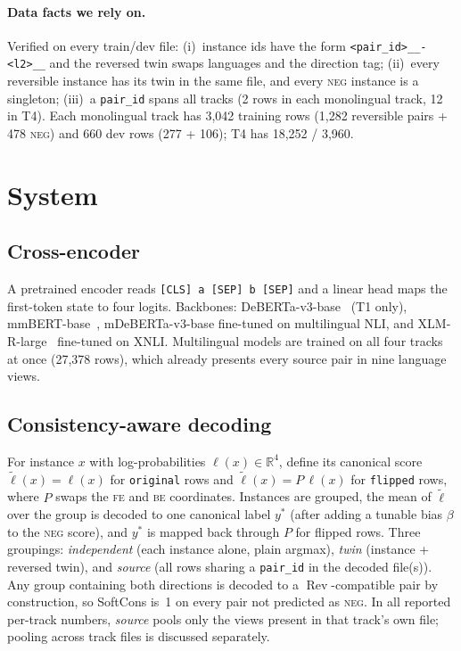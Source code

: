 \documentclass[11pt,a4paper]{article}
\newcommand{\rev}{\operatorname{Rev}}
\newcommand{\FE}{\textsc{fe}}
\newcommand{\BE}{\textsc{be}}
\newcommand{\NEG}{\textsc{neg}}
\begin{document}
\paragraph{Data facts we rely on.} Verified on every train/dev file:
(i)~instance ids have the form \texttt{<pair\_id>\_\_-<l2>\_\_}
and the reversed twin swaps languages and the direction tag;
(ii)~every reversible instance has its twin in the same file, and every \NEG{}
instance is a singleton;
(iii)~a \texttt{pair\_id} spans all tracks (2 rows in each monolingual track, 12
in T4).
Each monolingual track has 3{,}042 training rows (1{,}282 reversible pairs + 478
\NEG) and 660 dev rows (277 + 106); T4 has 18{,}252 / 3{,}960.

\section{System}

\subsection{Cross-encoder}
A pretrained encoder reads \texttt{[CLS] a [SEP] b [SEP]} and a linear head maps
the first-token state to four logits. Backbones: DeBERTa-v3-base~\cite{debertav3}
(T1 only), mmBERT-base~\cite{mmbert}, mDeBERTa-v3-base fine-tuned on
multilingual NLI, and XLM-R-large~\cite{xlmr} fine-tuned on XNLI. Multilingual
models are trained on all four tracks at once (27{,}378 rows), which already
presents every source pair in nine language views.

\subsection{Consistency-aware decoding}
For instance $x$ with log-probabilities $\ell(x)\in\mathbb{R}^4$, define its
canonical score $\tilde\ell(x)=\ell(x)$ for \texttt{original} rows and
$\tilde\ell(x)=P\,\ell(x)$ for \texttt{flipped} rows, where $P$ swaps the \FE{}
and \BE{} coordinates. Instances are grouped, the mean of $\tilde\ell$ over the
group is decoded to one canonical label $y^\ast$ (after adding a tunable bias
$\beta$ to the \NEG{} score), and $y^\ast$ is mapped back through $P$ for
flipped rows. Three groupings:
\emph{independent} (each instance alone, plain argmax),
\emph{twin} (instance + reversed twin), and
\emph{source} (all rows sharing a \texttt{pair\_id} in the decoded file(s)).
Any group containing both directions is decoded to a $\rev$-compatible pair by
construction, so SoftCons is~1 on every pair not predicted as \NEG. In all
reported per-track numbers, \emph{source} pools only the views present in that
track's own file; pooling across track files is discussed separately.
\end{document}
